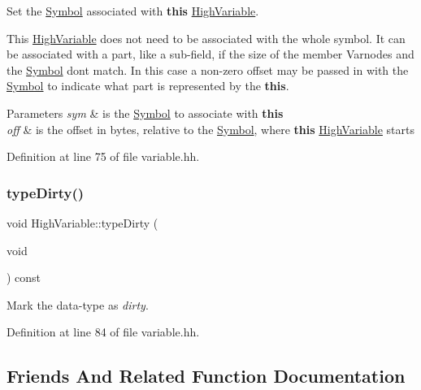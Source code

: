 Set the \mbox{\hyperlink{class_symbol}{Symbol}} associated with {\bfseries{this}} \mbox{\hyperlink{class_high_variable}{High\+Variable}}. 

This \mbox{\hyperlink{class_high_variable}{High\+Variable}} does not need to be associated with the whole symbol. It can be associated with a part, like a sub-\/field, if the size of the member Varnodes and the \mbox{\hyperlink{class_symbol}{Symbol}} don\textquotesingle{}t match. In this case a non-\/zero offset may be passed in with the \mbox{\hyperlink{class_symbol}{Symbol}} to indicate what part is represented by the {\bfseries{this}}. 
\begin{DoxyParams}{Parameters}
{\em sym} & is the \mbox{\hyperlink{class_symbol}{Symbol}} to associate with {\bfseries{this}} \\
\hline
{\em off} & is the offset in bytes, relative to the \mbox{\hyperlink{class_symbol}{Symbol}}, where {\bfseries{this}} \mbox{\hyperlink{class_high_variable}{High\+Variable}} starts \\
\hline
\end{DoxyParams}


Definition at line 75 of file variable.\+hh.

\mbox{\label{class_high_variable_ae46ff10cd5a8c8d35837784d6938ac2b}} 
\subsubsection{\texorpdfstring{typeDirty()}{typeDirty()}}
{\footnotesize\ttfamily void High\+Variable\+::type\+Dirty (\begin{DoxyParamCaption}\item[{void}]{ }\end{DoxyParamCaption}) const\hspace{0.3cm}{\ttfamily [inline]}}



Mark the data-\/type as {\itshape dirty}. 



Definition at line 84 of file variable.\+hh.



\subsection{Friends And Related Function Documentation}
\mbox{\label{class_high_variable_ada039d79291c7baead36ca12c2f1737b}} 
